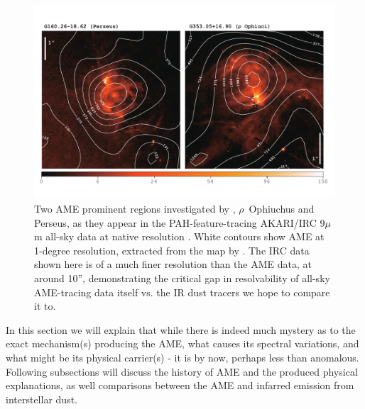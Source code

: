             \begin{figure}
              \centering
              \includegraphics[width=\textwidth]{../Plots/ch_intro/AME_contours.pdf}
                \caption{Two AME prominent regions investigated by \cite{planckxx11, tibbs11}, $\rho$~Ophiuchus and Perseus, as they appear in the PAH-feature-tracing AKARI/IRC 9$\mu$m all-sky data at native resolution \citep{ishihara10}. White contours show AME at 1-degree resolution, extracted from the map by  \cite{planck15X}. The IRC data shown here is of a much finer resolution than the AME data, at around 10'', demonstrating the critical gap in resolvability of all-sky AME-tracing data itself vs. the IR dust tracers we hope to compare it to. }
              \label{fig:AME_contours}
            \end{figure}
        In this section we will explain that while there is indeed much mystery as to the exact mechanism(s) producing the AME, what causes its spectral variations, and what might be its physical carrier(s) - it is by now, perhaps less than anomalous. Following subsections will discuss the history of AME and the produced physical explanations, as well comparisons between the AME and infarred emission from interstellar dust.

